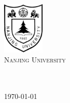 ﻿\begin{titlepage}
\begin{center}
\includegraphics[width=0.15\textwidth]{../shared/njulogo.pdf}\\[1cm]
\textsc{\huge Nanjing University}\\[3cm]
\\[0.5cm]
{ \Huge \bfseries \BookTitle}\\[0.4cm]


\vfill

{\large \today}

\end{center}

\end{titlepage}
